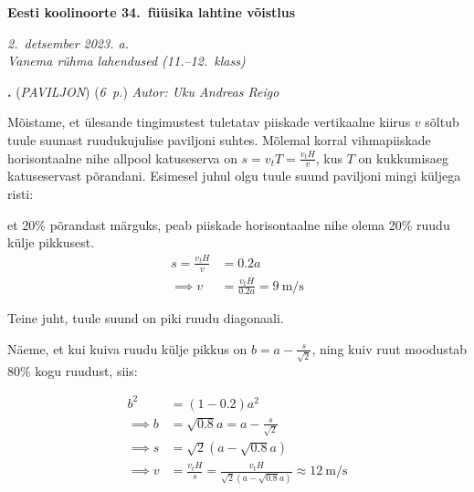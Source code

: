 \documentclass[11pt,a5paper]{article}
\newcommand{\numb}[1]{\vspace{5pt}\textbf{\large #1}}
\newcommand{\nimi}[1]{(\textsl{\small #1})}
\newcommand{\punktid}[1]{(\emph{#1~p.})}
\newcounter{ylesanne}
\newcommand{\yl}[1]{\addtocounter{ylesanne}{1}\numb{\theylesanne.} \nimi{#1} \newblock{}}
\newcommand{\autor}[1]{\emph{ Autor: #1}}%
\begin{document}
\begin{center}
  \textbf{\Large Eesti koolinoorte 34.\ füüsika lahtine võistlus} \par
  \emph{2.\ detsember 2023. a.\\Vanema rühma lahendused (11.--12.\ klass)}
\end{center}

\DeclareSIUnit{}

\yl{PAVILJON}
\punktid{6} \autor{Uku Andreas Reigo}

Mõistame, et ülesande tingimustest tuletatav piiskade vertikaalne kiirus $v$ sõltub tuule suunast ruudukujulise paviljoni suhtes. Mõlemal korral vihmapiiskade horisontaalne nihe allpool katuseserva on $s = v_t T = \frac{v_t H}{v}$, kus $T$ on kukkumisaeg katuseservast põrandani. Esimesel juhul olgu tuule suund paviljoni mingi küljega risti:

\osa et 20\% põrandast märguks, peab piiskade horisontaalne nihe olema 20\% ruudu külje pikkusest.
\begin{align*}
    s = \frac{v_t H}{v} &= 0.2a \\
    \implies v &= \frac{v_t H}{0.2a} = \SI{9}{\meter\per\second}
\end{align*}

\osa Teine juht, tuule suund on piki ruudu diagonaali.


Näeme, et kui kuiva ruudu külje pikkus on $b = a-\frac{s}{\sqrt{2}}$, ning kuiv ruut moodustab 80\% kogu ruudust, siis:

\begin{align*}
    b^2 &= (1-0.2)a^2\\
    \implies b &= \sqrt{0.8} a = a - \frac{s}{\sqrt{2}}\\
    \implies s &= \sqrt{2}(a-\sqrt{0.8}a) \\ 
    \implies v &= \frac{v_t H}{s} = \frac{v_t H}{\sqrt{2}(a-\sqrt{0.8}a)} \approx \SI{12}{\meter\per\second}
\end{align*}
\end{document}
